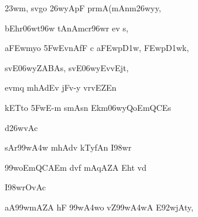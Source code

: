 {\dn {}\323wm, sv\0go \326wyApF prmA(mAnm\326wyy,{\dandabdn} \dontdisplaylinenum}

{\dn bEhr\306wt\396w tAnAmcr\396wr ev s, \vegdn\dontdisplaylinenum}

{\dn a\3FEwm\?yo \35FwEvnAfF c a\3FEwp\3D1w, \3FEwp\3D1wk,{\dandabdn} \dontdisplaylinenum}

{\dn sv\?{\qvb}E\306wyZABAs, sv\?{\qvb}E\306wyEvvEj\0t, \vegdn\dontdisplaylinenum}

{\dn evm\?q mhAd\?Ev jFv-y vrvEZ\0En{\dandabdn} \dontdisplaylinenum}

{\dn kETto \35FwE-m smAs\?n Ekm\306wyQoEmQCEs \vegdn\dontdisplaylinenum}



{\dn d\?\326wvAc{\dandabdn}\dontdisplaylinenum }

{\dn sAr\399w\?\3A4w\2 mhAd\?v kTy\?fAn I\398wr{\dandadn} \dontdisplaylinenum}

{\dn \399woEmQCAEm d\?v\?f mAqAZA\2 Eht\2 vd \vegdn\dontdisplaylinenum}

{\dn I\398wrOvAc{\dandabdn}\dontdisplaylinenum }

{\dn aA\399wmAZA\2 hF \399w\?\3A4wo vZ\0\399w\?\3A4wA E\392wjAty,{\dandadn} \dontdisplaylinenum}

